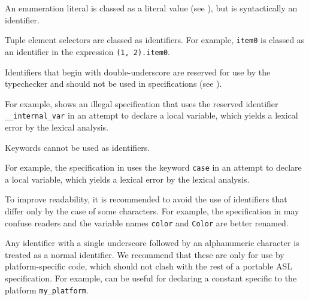 An enumeration literal is classed as a literal value
(see ), but is syntactically an identifier.

Tuple element selectors are classed as identifiers.
%
For example, \texttt{item0} is classed as an identifier
in the expression \verb|(1, 2).item0|.


Identifiers that begin with double-underscore are reserved for use
by the typechecker and should
not be used in specifications
(see ).

For example,  shows an illegal specification that uses the reserved
identifier \verb|__internal_var| in an attempt to declare a local variable,
which yields a lexical error by the lexical analysis.

Keywords cannot be used as identifiers.

For example, the specification in 
uses the keyword \verb|case| in an attempt to declare a local variable,
which yields a lexical error by the lexical analysis.

To improve readability, it is recommended to avoid the use of identifiers that differ
only by the case of some characters.
%
For example, the specification in 
may confuse readers and the variable names \verb|color| and \verb|Color| are better renamed.

Any identifier with a single underscore followed by an alphanumeric character
is treated as a normal identifier. We recommend that these are only
for use by platform-specific code, which should not clash with the rest of a
portable ASL specification.
%
For example, 
can be useful for declaring a constant specific to the platform \verb|my_platform|.

